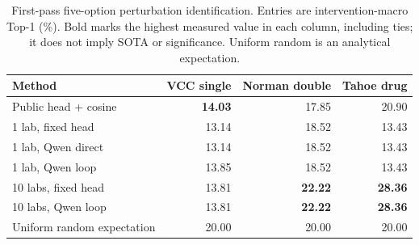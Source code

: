\begin{table}[htbp]
\centering\small
\caption{First-pass five-option perturbation identification. Entries are intervention-macro Top-1 (\%). Bold marks the highest measured value in each column, including ties; it does not imply SOTA or significance. Uniform random is an analytical expectation.}
\label{tab:trainable-cell-pilot}
\begin{tabular}{lrrr}
\toprule
Method & VCC single & Norman double & Tahoe drug \\
\midrule
Public head + cosine & \textbf{14.03} & 17.85 & 20.90 \\
1 lab, fixed head & 13.14 & 18.52 & 13.43 \\
1 lab, Qwen direct & 13.14 & 18.52 & 13.43 \\
1 lab, Qwen loop & 13.85 & 18.52 & 13.43 \\
10 labs, fixed head & 13.81 & \textbf{22.22} & \textbf{28.36} \\
10 labs, Qwen loop & 13.81 & \textbf{22.22} & \textbf{28.36} \\
\midrule
Uniform random expectation & 20.00 & 20.00 & 20.00 \\
\bottomrule
\end{tabular}
\end{table}


